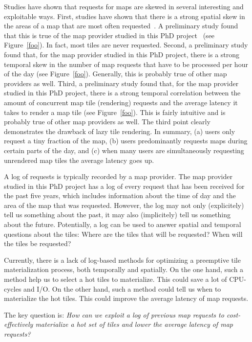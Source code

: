 \documentclass[11pt, oneside]{report}
\begin{document}
\begin{itemize}
Studies have shown that requests for maps are skewed in several interesting and exploitable ways. First, studies have shown that there is a strong spatial skew in the areas of a map that are most often requested~\cite{fisher07hotmap}. A preliminary study found that this is true of the map provider studied in this PhD project~\cite{gst2014digitalmapsupply} (see Figure~\ref{foo}). In fact, most tiles are never requested. Second, a preliminary study found that, for the map provider studied in this PhD project, there is a strong temporal skew in the number of map requests that have to be processed per hour of the day (see Figure~\ref{foo}). Generally, this is probably true of other map providers as well. Third, a preliminary study found that, for the map provider studied in this PhD project, there is a strong temporal correlation between the amount of concurrent map tile (rendering) requests and the average latency it takes to render a map tile (see Figure~\ref{foo}). This is fairly intuitive and is probably true of other map providers as well. The third point clearly demonstrates the drawback of lazy tile rendering. In summary, (a) users only request a tiny fraction of the map, (b) users predominantly requests maps during certain parts of the day, and (c) when many users are simultaneously requesting unrendered map tiles the average latency goes up.

A log of requests is typically recorded by a map provider. The map provider studied in this PhD project has a log of every request that has been received for the past five years, which includes information about the time of day and the area of the map that was requested. However, the log may not only (explicitely) tell us something about the past, it may also (implicitely) tell us something about the future. Potentially, a log can be used to answer spatial and temporal questions about the tiles: Where are the tiles that will be requested? When will the tiles be requested?

Currently, there is a lack of log-based methods for optimizing a preemptive tile materialization process, both temporally and spatially. On the one hand, such a method help us to select a hot tiles to materialize. This could save a lot of CPU-cycles and I/O. On the other hand, such a method could tell us when to materialize the hot tiles. This could improve the average latency of map requests. 

The key question is: \emph{How can we exploit a log of previous map requests to cost-effectively materialize a hot set of tiles and lower the average latency of map requests?}
\end{itemize}
\end{document}
